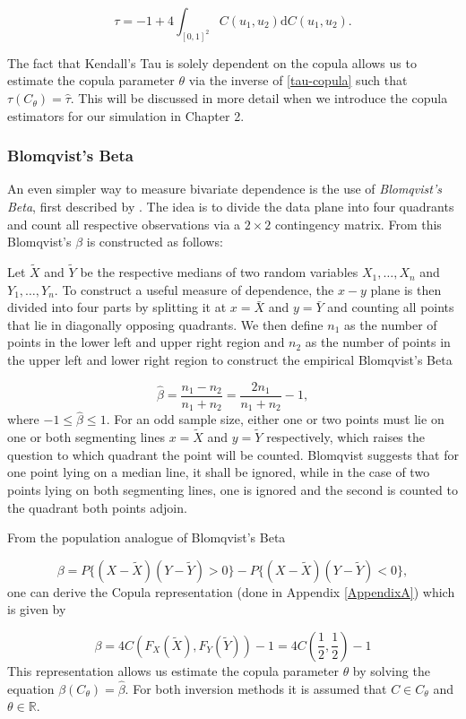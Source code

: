 \begin{equation}
	\label{tau-copula}
		\tau=-1+4 \int_{[0,1]^{2}} C\left(u_{1}, u_{2}\right) \mathrm{d} C\left(u_{1}, u_{2}\right) .
\end{equation}

The fact that Kendall's Tau is solely dependent on the copula allows us to estimate the copula parameter $\theta$ via the inverse of \ref{tau-copula} such that $\tau (C_\theta) = \hat{\tau}$. This will be discussed in more detail when we introduce the copula estimators for our simulation in Chapter 2.

\subsubsection*{Blomqvist's Beta}

An even simpler way to measure bivariate dependence is the use of \textit{Blomqvist's Beta}, first described by \citet{blomqvist1950measure}. The idea is to divide the data plane into four quadrants and count all respective observations via a $2 \times 2$ contingency matrix. From this Blomqvist's $\beta$ is constructed as follows:

Let $\tilde{X}$ and $\tilde{Y}$ be the respective medians of two random variables $X_1, \dots , X_n$ and $Y_1, \dots , Y_n$. To construct a useful measure of dependence, the $x-y$ plane is then divided into four parts by splitting it at $x=\bar{X}$ and $y=\bar{Y}$ and counting all points that lie in diagonally opposing quadrants. We then define $n_1$ as the number of points in the lower left and upper right region and $n_2$  as the number of points in the upper left and lower right region to construct the empirical Blomqvist's Beta

\begin{equation}
	\hat{\beta}=\frac{n_{1}-n_{2}}{n_{1}+n_{2}}=\frac{2 n_{1}}{n_{1}+n_{2}}-1 ,
\end{equation}
%
where $-1\leq \hat{\beta} \leq 1$. For an odd sample size, either one or two points must lie on one or both segmenting lines $x=\tilde{X}$ and $y=\tilde{Y}$ respectively, which raises the question to which quadrant the point will be counted. Blomqvist suggests that for one point lying on a median line, it shall be ignored, while in the case of two points lying on both segmenting lines, one is ignored and the second is counted to the quadrant both points adjoin.

From the population analogue of Blomqvist's Beta 

\begin{equation}
	\beta=P\{(X-\tilde{X})(Y-\tilde{Y})>0\}-P\{(X-\tilde{X})(Y-\tilde{Y})<0\} ,
\end{equation}
%
one can derive the Copula representation (done in Appendix \ref{AppendixA}) which is given by

\begin{equation}
	\label{beta-copula}
	\beta=4 C\left( F_{X}(\tilde{X}), F_{Y}(\tilde{Y})\right) -1 =4 C\left(\frac{1}{2}, \frac{1}{2}\right) -1
\end{equation}
%
This representation allows us estimate the copula parameter $\theta$ by solving the equation $\beta (C_\theta)=\hat{\beta}$. For both inversion methods it is assumed that $C \in C_\theta$ and $\theta \in \mathbb{R}$.